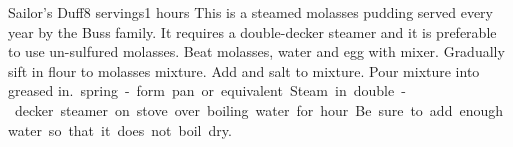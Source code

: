 \begin{recipe}{Sailor's Duff}{8 servings}{1 hours}
\freeform This is a steamed molasses pudding served every year by the Buss family.  It requires a double-decker steamer and it is preferable to use un-sulfured molasses.
Beat molasses, water and egg with mixer.
Gradually sift in flour to molasses mixture.
Add \bs{} and salt to mixture.
\newstep
Pour mixture into greased \unit[8]{in.} spring-form pan or equivalent.  Steam in double-decker steamer on stove over boiling water for \unit[1]{hour}. Be sure to add enough water so that it does not boil dry.
\end{recipe}
